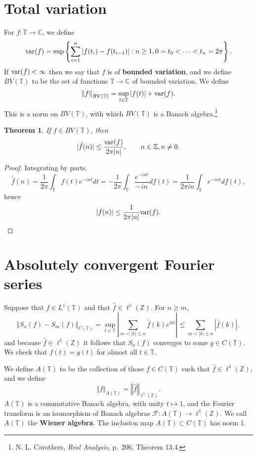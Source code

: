 \documentclass{article}
\newcommand{\var}{\ensuremath\mathrm{var}}
\newcommand{\norm}[1]{\left\Vert #1 \right\Vert}
\newtheorem{theorem}{Theorem}
\theoremstyle{definition}
\begin{document}
\section{Total variation}
For $f:\mathbb{T} \to \mathbb{C}$, we define
\[
\var(f) = \sup \left\{ \sum_{i=1}^n |f(t_i)-f(t_{i-1})|:
n \geq 1, 0=t_0<\cdots<t_n=2\pi \right\}.
\]
If $\var(f)<\infty$ then we say that $f$ is of \textbf{bounded variation}, and we define $BV(\mathbb{T})$ to be the set of functions
$\mathbb{T} \to \mathbb{C}$ of bounded variation. We define
\[
\norm{f}_{BV(\mathbb{T})} =\sup_{t \in \mathbb{T}} |f(t)|+\var(f).
\]
This is a norm on $BV(\mathbb{T})$, with which $BV(\mathbb{T})$ is a Banach algebra.\footnote{N. L. Carothers, {\em Real Analysis},
p.~206, Theorem 13.4.}

\begin{theorem}
If $f \in BV(\mathbb{T})$, then 
\[
|\hat{f}(n)| \leq \frac{\var(f)}{2\pi|n|}, \qquad n \in \mathbb{Z}, n \neq 0.
\]
\end{theorem}
\begin{proof}
Integrating by parts,
\[
\hat{f}(n)=\frac{1}{2\pi} \int_{\mathbb{T}} f(t) e^{-int} dt
=- \frac{1}{2\pi} \int_{\mathbb{T}} \frac{e^{-int}}{-in} df(t)
=\frac{1}{2\pi in} \int_{\mathbb{T}} e^{-int} df(t),
\]
hence
\[
|\hat{f}(n)| \leq \frac{1}{2\pi |n|} \var(f).
\]
\end{proof}


\section{Absolutely convergent Fourier series}
Suppose that $f \in L^1(\mathbb{T})$ and that $\hat{f} \in \ell^1(\mathbb{Z})$.
For $n \geq m$,
\[
\norm{S_n(f)-S_m(f)}_{C(\mathbb{T})} = 
\sup_{t \in \mathbb{T}} \left| \sum_{m < |k| \leq n} \hat{f}(k) e^{ikt} \right|
\leq \sum_{m < |k| \leq n} |\hat{f}(k)|,
\]
and because $\hat{f} \in \ell^1(\mathbb{Z})$ it follows that $S_n(f)$ converges to some 
$g \in C(\mathbb{T})$.
We check that $f(t)=g(t)$ for almost all $t \in \mathbb{T}$.

We define $A(\mathbb{T})$ to be the collection of those $f \in C(\mathbb{T})$ such that
$\hat{f} \in \ell^1(\mathbb{Z})$, and we define
\[
\norm{f}_{A(\mathbb{T})} = \norm{\hat{f}}_{\ell^1(\mathbb{Z})}.
\]
$A(\mathbb{T})$ is a commutative Banach algebra, with unity $t \mapsto 1$, and
the Fourier transform is an isomorphism of Banach algebras
$\mathscr{F}:A(\mathbb{T}) \to \ell^1(\mathbb{Z})$. 
We call $A(\mathbb{T})$ the \textbf{Wiener algebra}. The inclusion map $A(\mathbb{T}) \subset C(\mathbb{T})$
has  norm $1$. 
\end{document}
